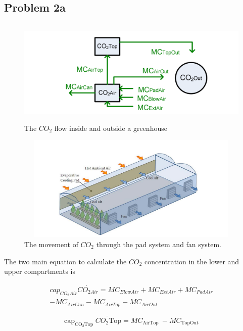 \subsection{Problem 2a}

\begin{figure}[h]
    \centering
    \includegraphics[width = 5in, height = 2in]{Code/Pic/figure.PNG}
    \caption{The $CO_2$ flow inside and outside a greenhouse}
    \label{fig:my_label}
\end{figure}

\begin{figure}[h]
    \centering
    \includegraphics[width = 5in, height = 2in]{Code/Pic/green.png}
    \caption{The movement of $CO_2$ through the pad system and fan system.}
    \label{fig:my_label}
\end{figure}

The two main equation to calculate the $CO_2$ concentration in the lower and upper compartments is

\begin{equation}
\begin{array}{r}
cap_{CO_{2} Air} \Dot{CO_{2Air}}=MC_{BlowAir}+MC_{ExtAir}+MC_{PadAir} \\
-MC_{AirCan}-MC_{AirTop}-MC_{AirOut}
\end{array}
\end{equation}

\begin{equation}
\operatorname{cap}_{\mathrm{CO}_{2} \mathrm{Top}} \Dot{{CO}_{2} \mathrm{Top}}=M C_{\text {AirTop }}-M C_{\text {TopOut }}
\end{equation}

